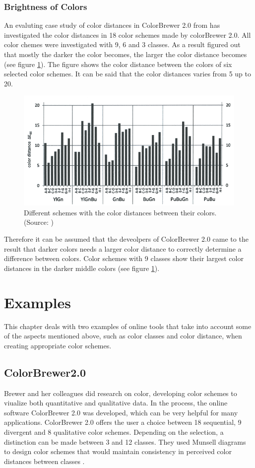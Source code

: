 \subsubsection{Brightness of Colors}

An evaluting case study of color distances in ColorBrewer 2.0 from \textcite{brychtovaC2017} has investigated the color distances in 18 color schemes made by colorBrewer 2.0. All color chemes were investigated with 9, 6 and 3 classes. As a result \textcite{brychtovaC2017} figured out that mostly the darker the color becomes, the larger the color distance becomes (see figure \ref{fig:colordist}). The figure shows the color distance between the colors of six selected color schemes. It can be said that the color distances varies from 5 up to 20.

\begin{figure}[h!]
	\centering
	\includegraphics[width=0.7\linewidth]{source/images/colordist}
	\caption{Different schemes with the color distances between their colors. \\
		(Source: \textcite{brychtovaC2017})}
	\label{fig:colordist}
\end{figure}

Therefore it can be assumed that the deveolpers of ColorBrewer 2.0 came to the result that darker colors needs a larger color distance to correctly determine a difference between colors. Color schemes with 9 classes show their largest color distances in the darker middle colors (see figure \ref{fig:colordist}).

\section{Examples}
This chapter deals with two examples of online tools that take into account some of the aspects mentioned above, such as color classes and color distance, when creating appropriate color schemes. 

\subsection{ColorBrewer2.0}
Brewer and her colleagues \parencite{brewer2003, brewer1994, brewer1996, brewer1997, brewer1999} did research on color, developing color schemes to viualize both quantitative and qualitative data. In the process, the online software ColorBrewer 2.0 was developed, which can be very helpful for many applications. ColorBrewer 2.0 offers the user a choice between 18 sequential, 9 divergent and 8 qualitative color schemes. Depending on the selection, a distinction can be made between 3 and 12 classes. They used Munsell diagrams to design color schemes that would maintain consistency in perceived color distances between classes \parencite{brychtovaC2017}. 

